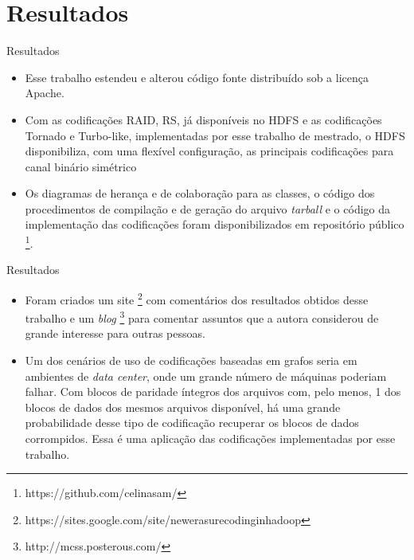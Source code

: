 \section{Resultados}

\begin{frame}{Resultados}

   \begin{itemize}

      \item<1-> Esse trabalho estendeu e alterou código fonte distribuído sob a licença Apache. 

      \item<2-> Com as codificações RAID, RS, já disponíveis no HDFS e as codificações Tornado e Turbo-like, implementadas por esse trabalho de mestrado, o HDFS disponibiliza, com uma flexível configuração, as principais codificações para canal binário simétrico

      \item<3-> Os diagramas de herança e de colaboração para as classes, o código dos procedimentos de compilação e de geração do arquivo \emph{tarball} e o código da implementação das codificações foram disponibilizados em repositório público \footnote{https://github.com/celinasam/}.

  \end{itemize}

\end{frame}

\begin{frame}{Resultados}

   \begin{itemize}

      \item<1-> Foram criados um site \footnote{https://sites.google.com/site/newerasurecodinginhadoop} com comentários dos resultados obtidos desse trabalho e um \emph{blog} \footnote{http://mcss.posterous.com/} para comentar assuntos que a autora considerou de grande interesse para outras pessoas.

      \item<2-> Um dos cenários de uso de codificações baseadas em grafos seria em ambientes de \emph{data center}, onde um grande número de máquinas poderiam falhar. Com blocos de paridade íntegros dos arquivos com, pelo menos, 1 dos blocos de dados dos mesmos arquivos disponível, há uma grande probabilidade desse tipo de codificação recuperar os blocos de dados corrompidos. Essa é uma aplicação das codificações implementadas por esse trabalho.
  \end{itemize}

\end{frame}

